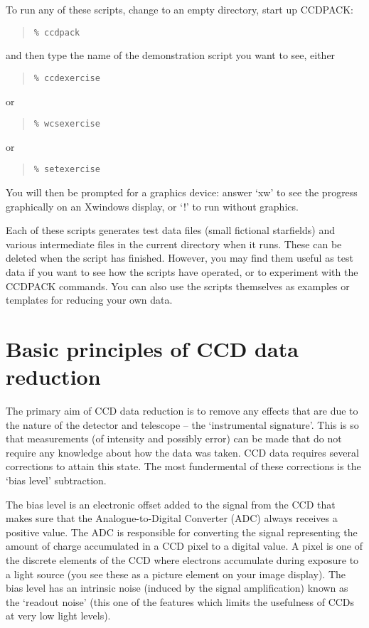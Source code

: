 \documentclass[twoside,11pt]{article}
\newcommand{\latexhtml}[2]{#1}
\newcommand{\xlabel}[1]{}
\renewcommand{\_}{\texttt{\symbol{95}}}
\newcommand{\ttsize}{\latexhtml{\small}{}}
\newenvironment{myquote}{\begin{quote}\ttsize}{\end{quote}}
\begin{document}
To run any of these scripts, change to an empty directory,
start up CCDPACK:
\begin{myquote}
\begin{verbatim}
% ccdpack
\end{verbatim}
\end{myquote}
and then type the name of the demonstration script you want to see, 
either
\begin{myquote}
\begin{verbatim}
% ccdexercise
\end{verbatim}
\end{myquote}
or
\begin{myquote}
\begin{verbatim}
% wcsexercise
\end{verbatim}
\end{myquote}
or
\begin{myquote}
\begin{verbatim}
% setexercise
\end{verbatim}
\end{myquote}
You will then be prompted for a graphics device: 
answer `xw' to see the progress graphically on an Xwindows display,
or `!' to run without graphics.

Each of these scripts generates test data files (small fictional
starfields) and various intermediate files in the current directory
when it runs.  These can be deleted when the script has finished.
However, you may find them useful as test data if you want to 
see how the scripts have operated, or to experiment with the CCDPACK
commands.  You can also use the scripts themselves as examples or
templates for reducing your own data.


\section{Basic principles of CCD data reduction\xlabel{CCDprinciples}}

The primary aim of CCD data reduction is to remove any effects that are
due to the nature of the detector and telescope -- the `instrumental
signature'.
This is so that measurements (of intensity and possibly error) can be
made that do not require any knowledge about how the data was taken.
CCD data requires several corrections to attain this state.
The most fundermental of these corrections is the `bias level' subtraction.

The bias level is an electronic offset added to the signal from the
CCD that makes sure that the Analogue-to-Digital Converter (ADC)
always receives a positive value.
The ADC is responsible for converting the signal representing
the amount of charge accumulated in a CCD pixel to a digital value.
A pixel is one of the discrete elements of the CCD where electrons
accumulate during exposure to a light source (you see these as a
picture element on your image display).
The bias level has an intrinsic noise (induced by the signal
amplification) known as the `readout noise' (this one of the features
which limits the usefulness of CCDs at very low light levels).
\end{document}
